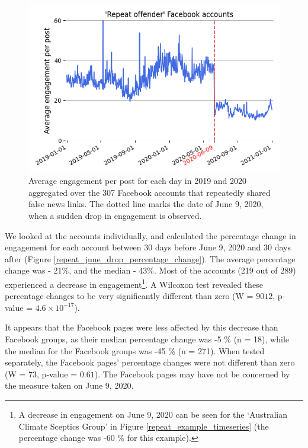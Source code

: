 \documentclass[11pt,a4paper]{article}
\begin{document}
\begin{figure}[!h]
\centering
\includegraphics[width=\linewidth]{./../figure/repeat_average_timeseries.png}
\caption{Average engagement per post for each day in 2019 and 2020 aggregated over the 307 Facebook accounts that repeatedly shared false news links. The dotted line marks the date of June 9, 2020, when a sudden drop in engagement is observed.}
\label{repeat_average_timeseries}
\end{figure}

We looked at the accounts individually, and calculated the percentage change in engagement for each account between 30 days before June 9, 2020 and 30 days after (Figure \ref{repeat_june_drop_percentage_change}). 
The average percentage change was - 21\%, and the median - 43\%. Most of the accounts (219 out of 289) experienced a decrease in engagement\footnote{A decrease in engagement on June 9, 2020 can be seen for the `Australian Climate Sceptics Group' in Figure \ref{repeat_example_timeseries} (the percentage change was -60 \% for this example).}.
A Wilcoxon test revealed these percentage changes to be very significantly different than zero (W = $9012$, p-value = $4.6 \times 10^{-17}$).

It appears that the Facebook pages were less affected by this decrease than Facebook groups, as their median percentage change was -5 \% (n = 18), while the median for the Facebook groups was -45 \% (n = 271). 
When tested separately, the Facebook pages' percentage changes were not different than zero (W = $73$, p-value = $0.61$).
The Facebook pages may have not be concerned by the measure taken on June 9, 2020.
\end{document}

